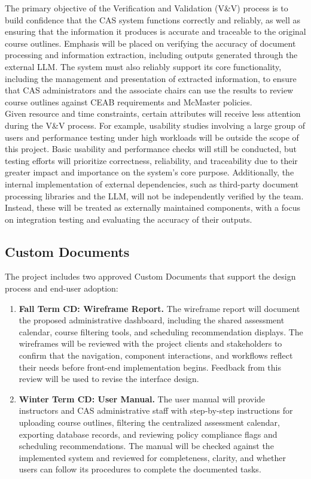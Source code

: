 \documentclass[12pt, titlepage]{article}
\begin{document}
The primary objective of the Verification and Validation (V\&V) process is to build confidence 
that the CAS system functions correctly and reliably, as well as ensuring that the information 
it produces is accurate and traceable to the original course outlines. Emphasis will be placed 
on verifying the accuracy of document processing and information extraction, including outputs 
generated through the external LLM. The system must also reliably support its core functionality, 
including the management and presentation of extracted information, to ensure that CAS 
administrators and the associate chairs can use the results to review course outlines against 
CEAB requirements and McMaster policies.\\


\noindent Given resource and time constraints, certain attributes will receive less attention during the 
V\&V process. For example, usability studies involving a large group of users and performance 
testing under high workloads will be outside the scope of this project. Basic usability and 
performance checks will still be conducted, but testing efforts will prioritize correctness, 
reliability, and traceability due to their greater impact and importance on the system's core 
purpose. Additionally, the internal implementation of external dependencies, such as third-party 
document processing libraries and the LLM, will not be independently verified by the team. 
Instead, these will be treated as externally maintained components, with a focus on integration 
testing and evaluating the accuracy of their outputs.


\subsection{Custom Documents}

The project includes two approved Custom Documents that support the design
process and end-user adoption:

\begin{enumerate}
    \item \textbf{Fall Term CD: Wireframe Report.}
    The wireframe report will document the proposed administrative dashboard,
    including the shared assessment calendar, course filtering tools, and
    scheduling recommendation displays. The wireframes will be reviewed with
    the project clients and stakeholders to confirm that the navigation,
    component interactions, and workflows reflect their needs before
    front-end implementation begins. Feedback from this review will be used
    to revise the interface design.

    \item \textbf{Winter Term CD: User Manual.}
    The user manual will provide instructors and CAS administrative staff with
    step-by-step instructions for uploading course outlines, filtering the
    centralized assessment calendar, exporting database records, and reviewing
    policy compliance flags and scheduling recommendations. The manual will
    be checked against the implemented system and reviewed for completeness,
    clarity, and whether users can follow its procedures to complete the
    documented tasks.
\end{enumerate}
\end{document}
